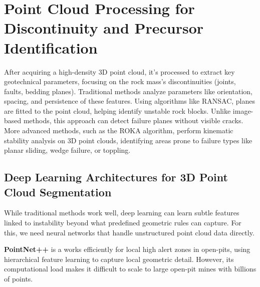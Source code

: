 \documentclass{article}
\begin{document}
\section{Point Cloud Processing for Discontinuity and Precursor Identification}
After acquiring a high-density 3D point cloud, it's processed to extract key geotechnical parameters, focusing on the rock mass's discontinuities (joints, faults, bedding planes). Traditional methods analyze parameters like orientation, spacing, and persistence of these features. Using algorithms like RANSAC, planes are fitted to the point cloud, helping identify unstable rock blocks. Unlike image-based methods, this approach can detect failure planes without visible cracks. More advanced methods, such as the ROKA algorithm, perform kinematic stability analysis on 3D point clouds, identifying areas prone to failure types like planar sliding, wedge failure, or toppling. \cite{ROKA}

\subsection{Deep Learning Architectures for 3D Point Cloud Segmentation}
While traditional methods work well, deep learning can learn subtle features linked to instability beyond what predefined geometric rules can capture. For this, we need neural networks that handle unstructured point cloud data directly.

\textbf{PointNet++} is a works efficiently for local high alert zones in open-pits, using hierarchical feature learning to capture local geometric detail. However, its computational load makes it difficult to scale to large open-pit mines with billions of points.
\end{document}
